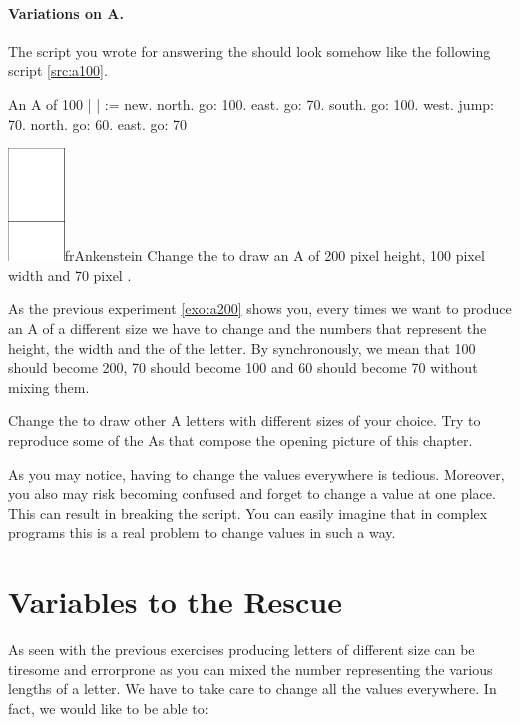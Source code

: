 \paragraph{Variations on A.}
The script you wrote for answering the  should look
somehow like the following script \ref{src:a100}.

\begin{scriptwithtitle}{An A of 100}\label{src:a100}
| \caro |
\caro := \Turtle new.
\caro north.
\caro go: 100.
\caro east.
\caro go: 70.
\caro south.
\caro go: 100.
\caro west.
\caro jump: 70.
\caro north.
\caro go: 60.
\caro east.
\caro go: 70
\end{scriptwithtitle}

\begin{exofigwithsizeandtitle}[0.5]{\includegraphics[width=1.5cm]{varA200}}{frAnkenstein}\label{exo:a200}
Change the  to draw an A of 200 pixel height, 100
pixel width and 70 pixel \dist.
\end{exofigwithsizeandtitle}


As the previous experiment \ref{exo:a200} shows you, every times we want to produce an A of a different size we have to change  and
 the numbers that represent the height, the
width and the \dist of the letter. By synchronously, we mean that 100 should become
200, 70 should become 100 and 60 should become 70 without mixing them.

\begin{exonofig}
Change the  to draw other A letters with different
sizes of your choice.  Try to reproduce some of the As that compose the opening
picture of this chapter.
\end{exonofig}


As you may notice, having to change the values everywhere is
tedious. Moreover, you also may risk becoming confused and forget to
change a value at one place.  This can  result in breaking the
script. You can easily imagine that in complex programs this is
a real problem to change values in such a way.

\section{Variables to the Rescue}
As seen with the previous exercises producing letters of different
size can be tiresome and errorprone as you can mixed the number representing the various lengths of a letter. We have to take care to change all the values everywhere. In fact, we would like to be able to:

